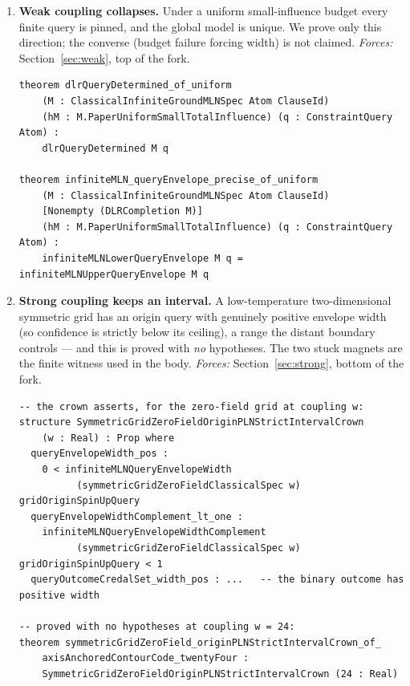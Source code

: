 \documentclass[]{article}
\begin{document}
\begin{enumerate}
\begin{lstlisting}
theorem not_forall_impreciseDeFinetti_
    analyticMixingFamilyProcessLawCrown_imp_
    pointwiseZeroInterior_closed :
    not (forall (C : Set BernoulliMixture) (hC : C.Nonempty),
        ImpreciseDeFinettiAnalyticMixingFamilyProcessLawCrown C hC ->
          AnalyticMixingFamilyPointwiseZeroInterior C)
\end{lstlisting}

\item\label{item:weak} \textbf{Weak coupling collapses.} Under a uniform
small-influence budget every finite query is pinned, and the global model is
unique. We prove only this direction; the converse (budget failure forcing
width) is not claimed. \emph{Forces:} Section~\ref{sec:weak}, top of the fork.
\begin{lstlisting}
theorem dlrQueryDetermined_of_uniform
    (M : ClassicalInfiniteGroundMLNSpec Atom ClauseId)
    (hM : M.PaperUniformSmallTotalInfluence) (q : ConstraintQuery Atom) :
    dlrQueryDetermined M q

theorem infiniteMLN_queryEnvelope_precise_of_uniform
    (M : ClassicalInfiniteGroundMLNSpec Atom ClauseId)
    [Nonempty (DLRCompletion M)]
    (hM : M.PaperUniformSmallTotalInfluence) (q : ConstraintQuery Atom) :
    infiniteMLNLowerQueryEnvelope M q = infiniteMLNUpperQueryEnvelope M q
\end{lstlisting}

\item\label{item:strong} \textbf{Strong coupling keeps an interval.} A
low-temperature two-dimensional symmetric grid has an origin query with genuinely
positive envelope width (so confidence is strictly below its ceiling), a range
the distant boundary controls --- and this is proved with \emph{no} hypotheses.
The two stuck magnets are the finite witness used in the body. \emph{Forces:}
Section~\ref{sec:strong}, bottom of the fork.
\begin{lstlisting}
-- the crown asserts, for the zero-field grid at coupling w:
structure SymmetricGridZeroFieldOriginPLNStrictIntervalCrown
    (w : Real) : Prop where
  queryEnvelopeWidth_pos :
    0 < infiniteMLNQueryEnvelopeWidth
          (symmetricGridZeroFieldClassicalSpec w) gridOriginSpinUpQuery
  queryEnvelopeWidthComplement_lt_one :
    infiniteMLNQueryEnvelopeWidthComplement
          (symmetricGridZeroFieldClassicalSpec w) gridOriginSpinUpQuery < 1
  queryOutcomeCredalSet_width_pos : ...   -- the binary outcome has positive width

-- proved with no hypotheses at coupling w = 24:
theorem symmetricGridZeroField_originPLNStrictIntervalCrown_of_
    axisAnchoredContourCode_twentyFour :
    SymmetricGridZeroFieldOriginPLNStrictIntervalCrown (24 : Real)


\end{lstlisting}
\end{enumerate}
\end{document}
